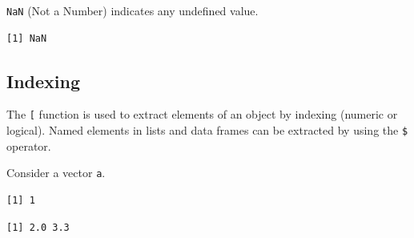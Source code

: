 \texttt{NaN} (Not a Number) indicates any undefined value.

\begin{Shaded}
\begin{Highlighting}[]
\OperatorTok{/}
\end{Highlighting}
\end{Shaded}

\begin{verbatim}
[1] NaN
\end{verbatim}

\hypertarget{indexing}{%
\subsection{Indexing}\label{indexing}}

The \texttt{{[}} function is used to extract elements of an object by
indexing (numeric or logical). Named elements in lists and data frames
can be extracted by using the \texttt{\$} operator.

Consider a vector \texttt{a}.

\begin{Shaded}
\begin{Highlighting}[]
\StringTok{ }\NormalTok{(}\NormalTok{, }\NormalTok{, }\NormalTok{, }\NormalTok{, }\NormalTok{)}
\NormalTok{a[}\NormalTok{]}
\end{Highlighting}
\end{Shaded}

\begin{verbatim}
[1] 1
\end{verbatim}

\begin{Shaded}
\begin{Highlighting}[]
\NormalTok{a[}\OperatorTok{:}\NormalTok{]}
\end{Highlighting}
\end{Shaded}

\begin{verbatim}
[1] 2.0 3.3
\end{verbatim}

\begin{Shaded}
\begin{Highlighting}[]
\NormalTok{a[a }\OperatorTok{>}\StringTok{ }\NormalTok{]}
\end{Highlighting}
\end{Shaded}

